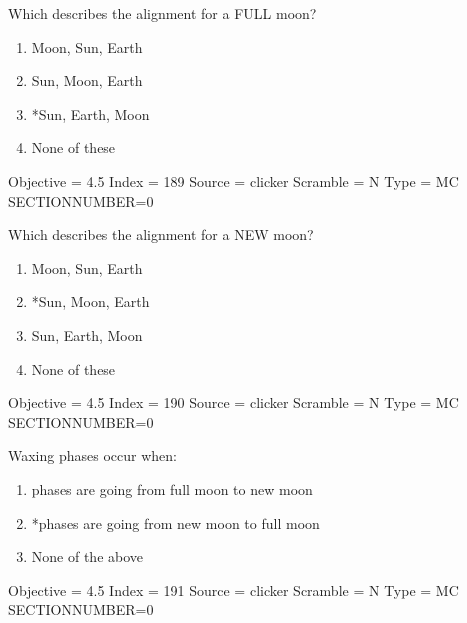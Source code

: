 \documentclass[11pt]{article}
\begin{document}
\begin{enumerate}
\begin{minipage}{\textwidth}
\begin{minipage}{\textwidth}
\item Which describes the alignment for a FULL moon?
\begin{multicols}{3}
\begin{enumerate} 
\setlength{\itemsep}{1pt} 
\setlength{\parskip}{0pt} 
\setlength{\parsep}{0pt}
\setlength{\multicolsep}{1pt} 
\item Moon, Sun, Earth
\item Sun, Moon, Earth
\item *Sun, Earth, Moon
\item None of these
\end{enumerate} 
\vfill 
\end{multicols}

Objective = 4.5
Index = 189
Source = clicker
Scramble = N
Type = MC
SECTIONNUMBER=0
\end{minipage}
\end{minipage}
\vskip 0.20in

\begin{minipage}{\textwidth}
\begin{minipage}{\textwidth}
\item Which describes the alignment for a NEW moon?
\begin{multicols}{3}
\begin{enumerate} 
\setlength{\itemsep}{1pt} 
\setlength{\parskip}{0pt} 
\setlength{\parsep}{0pt}
\setlength{\multicolsep}{1pt} 
\item Moon, Sun, Earth
\item *Sun, Moon, Earth
\item Sun, Earth, Moon
\item None of these
\end{enumerate} 
\vfill 
\end{multicols}

Objective = 4.5
Index = 190
Source = clicker
Scramble = N
Type = MC
SECTIONNUMBER=0
\end{minipage}
\end{minipage}
\vskip 0.20in

\begin{minipage}{\textwidth}
\begin{minipage}{\textwidth}
\item Waxing phases occur when:
\begin{enumerate} 
\setlength{\itemsep}{1pt} 
\setlength{\parskip}{0pt} 
\setlength{\parsep}{0pt}
\setlength{\multicolsep}{1pt} 
\item phases are going from full moon to new moon
\item *phases are going from new moon to full moon
\item None of the above
\end{enumerate} 
Objective = 4.5
Index = 191
Source = clicker
Scramble = N
Type = MC
SECTIONNUMBER=0
\end{minipage}
\end{minipage}
\vskip 0.20in


\end{enumerate}
\end{document}
